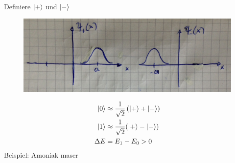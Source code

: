 \FloatBarrier
\newpage
Definiere $\ket{+}$	und $\ket{-}$
	\begin{figure} [h]
		\begin{center}
			\includegraphics[width= \textwidth]{Tunneln_durch_eine_Potentialbarriere4}
		\end{center}
	\end{figure}
\FloatBarrier
	\begin{align*}
		\ket{0} &\approx \frac{1}{\sqrt{2}} \left(\ket{+} + \ket{-}\right) \\
		\ket{1} &\approx \frac{1}{\sqrt{2}} (\ket{+} - \ket{-}) \\
		\Delta E &= E_1 - E_0 > 0 
	\end{align*}
Beispiel: Amoniak maser

